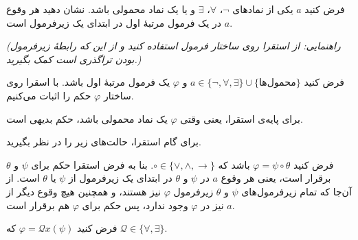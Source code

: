 فرض کنید $a$ یکی از نمادهای $\neg$، $\forall$، $\exists$ و یا یک نماد محمولی باشد. نشان دهید هر وقوع $a$ در یک فرمول مرتبهٔ اول در ابتدای یک زیرفرمول است.

\emph{(راهنمایی: از استقرا روی ساختار فرمول استفاده کنید و از این که رابطهٔ زیرفرمول بودن تراگذری است کمک بگیرید.)}
\begin{ans}
  فرض کنید $a \in \{\neg, \forall, \exists\} \cup \{\text{محمول‌ها}\}$ و $\varphi$ یک فرمول مرتبهٔ اول باشد. با اسقرا روی ساختار $\varphi$ حکم را اثبات می‌کنیم.

  برای پایه‌ی استقرا، یعنی وقتی $\varphi$ یک نماد محمولی باشد، حکم بدیهی است.

  برای گام استقرا، حالت‌های زیر را در نظر بگیرید.
  
  فرض کنید $\varphi = \psi \circ \theta$ باشد که $\circ \in \{\vee, \wedge, \rightarrow\}$. بنا به فرض استقرا حکم برای $\psi$ و $\theta$ برقرار است، یعنی هر وقوع $a$ در $\psi$ و $\theta$ در ابتدای یک زیرفرمول از $\psi$ یا $\theta$ است. از آن‌جا که تمام زیرفرمول‌های $\psi$ و $\theta$ زیرفرمول $\varphi$ نیز هستند، و همچنین هیچ وقوع دیگر از $a$ نیز در $\varphi$ وجود ندارد، پس حکم برای $\varphi$ هم برقرار است.

  فرض کنید $\varphi = \mathcal{Q} x (\psi)$ که $\mathcal{Q} \in \{\forall, \exists\}$.
\end{ans}

